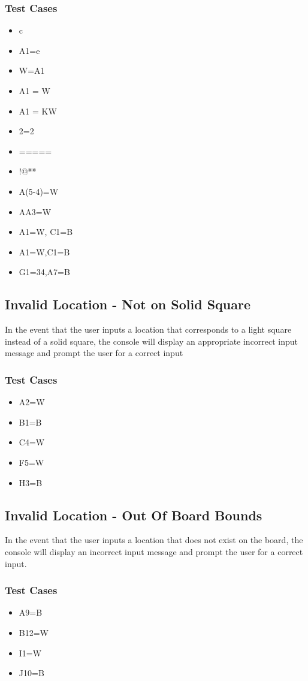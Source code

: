 \documentclass{article}
\begin{document}
\subsubsection*{Test Cases}
\begin{itemize}
\item c
\item A1=e
\item W=A1
\item A1 = W
\item A1 = KW
\item 2=2
\item =====
\item !@**
\item A(5-4)=W
\item AA3=W
\item A1=W, C1=B
\item A1=W,\qquad C1=B
\item G1=34,A7=B
\end{itemize}

\subsection{Invalid Location - Not on Solid Square}
In the event that the user inputs a location that corresponds to a light square instead of a solid square, the console will display an appropriate incorrect input message and prompt the user for a correct input

\subsubsection*{Test Cases}
\begin{itemize}
\item A2=W
\item B1=B
\item C4=W
\item F5=W
\item H3=B
\end{itemize}

\subsection{Invalid Location - Out Of Board Bounds}
In the event that the user inputs a location that does not exist on the board, the console will display an incorrect input message and prompt the user for a correct input.

\subsubsection*{Test Cases}
\begin{itemize}
\item A9=B
\item B12=W
\item I1=W
\item J10=B
\end{itemize}
\end{document}
